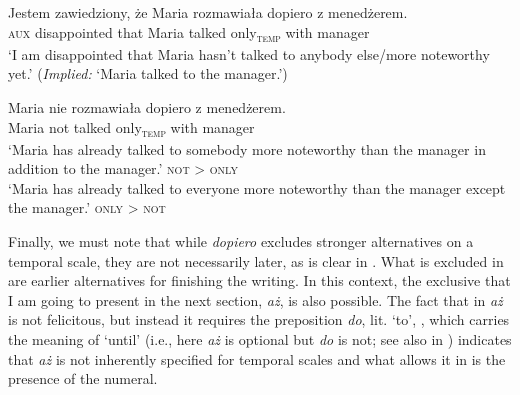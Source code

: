 \documentclass[output=paper,colorlinks,citecolor=brown]{langscibook}
\begin{document}
\ea\label{ex:tom:59}
\begin{xlist}
\end{xlist}
\z 

\ea\label{ex:tom:60}
\gll Jestem zawiedziony, że Maria rozmawiała dopiero z menedżerem.\\
 \textsc{aux} disappointed that Maria talked only\textsubscript{\textsc{temp}}   with manager\\
\glt `I am disappointed that Maria hasn’t talked to anybody else/more noteworthy yet.’ (\textit{Implied:} ‘Maria talked to the manager.’)\\
\z 

\ea\label{ex:tom:61}
\gll Maria nie rozmawiała dopiero z menedżerem.\\
Maria not talked only\textsubscript{\textsc{temp}} with manager\\
\ea
‘Maria has already talked to somebody more noteworthy than the manager in addition to the manager.’ \hfill \textsc{not} > \textsc{only}\\
\ex
‘Maria has already talked to everyone more noteworthy than the manager except the manager.’ \hfill  \textsc{only} > \textsc{not}
\z 
\z 

\noindent Finally, we must note that while \textit{dopiero} excludes stronger alternatives on a temporal scale, they are not necessarily later, as is clear in . What is excluded in  are earlier alternatives for finishing the writing. In this context, the exclusive that I am going to present in the next section, \textit{aż}, is also possible. The fact that in  \textit{aż} is not felicitous, but instead it requires the preposition \textit{do}, lit. ‘to’, , which carries the meaning of `until' (i.e., here \textit{aż} is optional but \textit{do} is not; see also  in ) indicates that \textit{aż} is not inherently specified for temporal scales and what allows it in  is the presence of the numeral.
\end{document}
